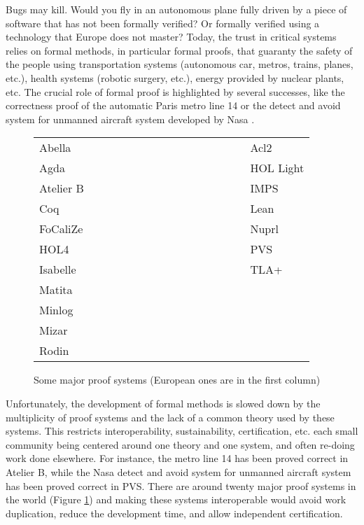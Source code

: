 Bugs may kill. Would you fly in an autonomous plane fully driven by a
piece of software that has not been formally verified?  Or formally
verified using a technology that Europe does not master? Today, the
trust in critical systems relies on formal methods, in particular
formal proofs, that guaranty the safety of the people using
transportation systems (autonomous car, metros, trains, planes, etc.),
health systems (robotic surgery, etc.), energy provided by nuclear
plants, etc. The crucial role of formal proof is highlighted by
several successes, like the correctness proof of the automatic Paris
metro line 14 \cite{metro14} or the detect and avoid system for
unmanned aircraft system developed by Nasa \cite{Munoz16}.

\thispagestyle{empty}

\begin{figure}
\begin{tabular}{ll}
{\sc Abella}~~~~~~~~~~~~~~~~~~~~~~~~~~~~~~&{\sc Acl2}\\
{\sc Agda}  &  {\sc HOL Light}\\
{\sc Atelier B}  &  {\sc IMPS}\\
{\sc Coq}  &  {\sc Lean}\\
{\sc FoCaliZe}  &  {\sc Nuprl}\\
{\sc HOL4}  &  {\sc PVS}\\
{\sc Isabelle}  &  {\sc TLA+}\\
{\sc Matita}\\
{\sc Minlog}\\
{\sc Mizar}\\
{\sc Rodin}\\
\end{tabular}
\caption{Some major proof systems (European ones are in the first column) \label{systems}}
\end{figure}

Unfortunately, the development of formal methods is slowed down by the
multiplicity of proof systems and the lack of a common theory used by
these systems. This restricts interoperability, sustainability,
certification, etc.  each small community being centered around one
theory and one system, and often re-doing work done elsewhere.  For
instance, the metro line 14 has been proved correct in {\sc Atelier
B}, while the Nasa detect and avoid system for unmanned aircraft
system has been proved correct in {\sc PVS}.  There are around twenty
major proof systems in the world (Figure \ref{systems}) and making
these systems interoperable would avoid work duplication, reduce the
development time, and allow independent certification.

